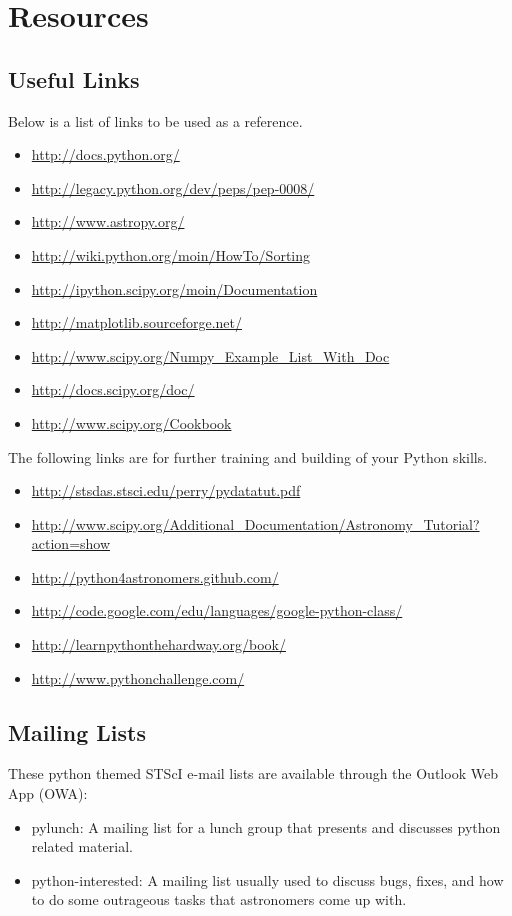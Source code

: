 \chapter{Resources}
\label{ch:links}
 
\section{Useful Links }
Below is a list of links to be used as a reference.
\begin{itemize}
\item \url{http://docs.python.org/}
\item \url{http://legacy.python.org/dev/peps/pep-0008/}
\item \url{http://www.astropy.org/}
\item \url{http://wiki.python.org/moin/HowTo/Sorting}
\item \url{http://ipython.scipy.org/moin/Documentation}
\item \url{http://matplotlib.sourceforge.net/}
\item \url{http://www.scipy.org/Numpy\_Example\_List\_With\_Doc}
\item \url{http://docs.scipy.org/doc/}
\item \url{http://www.scipy.org/Cookbook}
\end{itemize}

The following links are for further training and building of your
Python skills.
\begin{itemize}
\item \url{http://stsdas.stsci.edu/perry/pydatatut.pdf}
\item \url{http://www.scipy.org/Additional_Documentation/Astronomy_Tutorial?action=show}
\item \url{http://python4astronomers.github.com/} 
\item \url{http://code.google.com/edu/languages/google-python-class/}
\item \url{http://learnpythonthehardway.org/book/}
\item \url{http://www.pythonchallenge.com/}
\end{itemize}

\section{Mailing Lists}
These python themed STScI e-mail lists are available through the 
Outlook Web App (OWA):
\begin{itemize}
\item pylunch: A mailing list for a lunch group that presents and
  discusses python related material.
\item python-interested: A mailing list usually used to discuss bugs,
  fixes, and how to do some outrageous tasks that astronomers come up
  with.
\end{itemize}